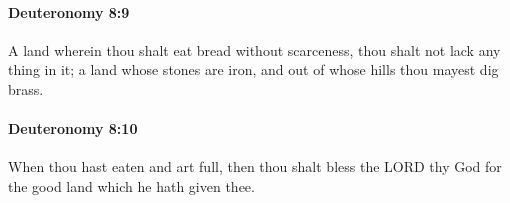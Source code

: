 		\paragraph{Deuteronomy 8:9} %
			\label{DEUTERONOMY-8-9}

			A land wherein thou shalt eat bread without scarceness, thou shalt not lack any thing in it; a land whose stones are iron, and out of whose hills thou mayest dig brass.


		\paragraph{Deuteronomy 8:10} %
			\label{DEUTERONOMY-8-10}

			When thou hast eaten and art full, then thou shalt bless the LORD thy God for the good land which he hath given thee.


